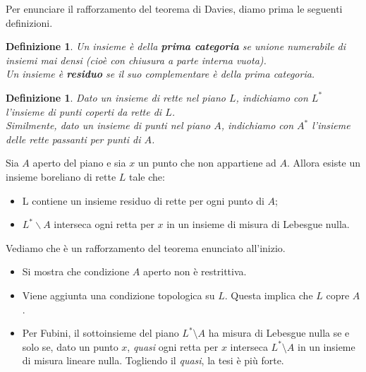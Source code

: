 \documentclass[11pt]{beamer} %
\newcommand{\<}{\langle}
\renewcommand{\>}{\rangle}
\theoremstyle{theorem}
\theoremstyle{theorem}
\theoremstyle{theorem}
\theoremstyle{theorem}
\newtheorem{defin}[teo]{Definizione}
\theoremstyle{theorem}
\begin{document}
\begin{frame}[fragile]
	Per enunciare il rafforzamento del teorema di Davies, diamo prima le seguenti definizioni.\\
	\pause	
	\begin{defin}
	Un insieme è della \textbf{prima categoria} se unione numerabile di insiemi mai densi (cioè con chiusura a parte interna vuota).\\ \pause
	Un insieme è \textbf{residuo} se il suo complementare è della prima categoria. 
	\end{defin}
	\pause
	\begin{defin}
	Dato un insieme di rette nel piano $L$, indichiamo con $L^*$ l'insieme di punti coperti da rette di $L$.\\
	\pause
	Similmente, dato un insieme di punti nel piano $A$, indichiamo con $A^*$ l'insieme delle rette passanti per punti di $A$.
	\end{defin}

\end{frame}

\begin{frame}[fragile]

\begin{lemma}[1]
	Sia $A$ aperto del piano e sia $x$ un punto che non appartiene ad $A$. Allora esiste un insieme boreliano di rette $L$ tale che:\\
	\begin{itemize}
		\item L contiene un insieme residuo di rette per ogni punto di $A$;\\
		\item $L^{*} \backslash A$ interseca ogni retta per $x$ in un insieme di misura di Lebesgue nulla.\\
	\end{itemize}
\end{lemma}
	\pause
	Vediamo che è un rafforzamento del teorema enunciato all'inizio.\\
	\pause
	\begin{itemize}
		\item Si mostra che condizione $A$ aperto non è restrittiva.\\
		\pause
		\item Viene aggiunta una condizione topologica su $L$. Questa implica che $L$ copre $A$.\\
		\pause
		\item Per Fubini, il sottoinsieme del piano $L^* \setminus A$ ha misura di Lebesgue nulla se e solo se, dato un punto $x$, \emph{quasi} ogni retta per $x$ interseca $L^* \setminus A$ in un insieme di misura lineare nulla. Togliendo il \emph{quasi}, la tesi è più forte.\\
	\end{itemize}

\end{frame}
\end{document}
